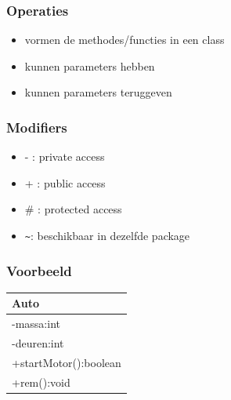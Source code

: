 \documentclass{beamer}
\begin{document}
\begin{frame}\frametitle{Operaties}
  \begin{itemize}
  \item vormen de methodes/functies in een class
  \item kunnen parameters hebben
  \item kunnen parameters teruggeven
  \end{itemize}
\end{frame}

\begin{frame}[fragile]\frametitle{Modifiers}
  \begin{itemize}
  \item - : private access
  \item + : public access
  \item \# : protected access
  \item \verb|~|: beschikbaar in dezelfde package
  \end{itemize}
\end{frame}


\begin{frame}[fragile]\frametitle{Voorbeeld}
  \begin{center}
  \begin{tabular}{|l|}
\hline
Auto\\
\hline
-massa:int\\
-deuren:int\\
\hline
+startMotor():boolean\\
+rem():void\\
\hline
\end{tabular}
  \end{center}
\end{frame}

\end{document}
